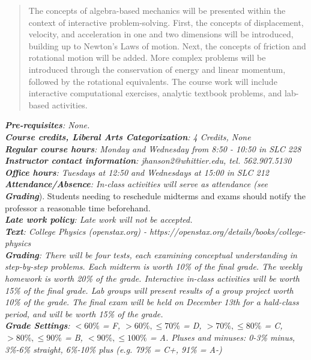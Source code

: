 \documentclass[10pt]{article}
\begin{document}
\maketitle

\begin{abstract}
The concepts of algebra-based mechanics will be presented within the context of interactive problem-solving.  First, the concepts of displacement, velocity, and acceleration in one and two dimensions will be introduced, building up to Newton's Laws of motion.  Next, the concepts of friction and rotational motion will be added.  More complex problems will be introduced through the conservation of energy and linear momentum, followed by the rotational equivalents.  The course work will include interactive computational exercises, analytic textbook problems, and lab-based activities.
\end{abstract}
\noindent
\textit{\textbf{Pre-requisites}: None.} \\
\textit{\textbf{Course credits, Liberal Arts Categorization}: 4 Credits, None} \\
\textit{\textbf{Regular course hours}: Monday and Wednesday from 8:50 - 10:50 in SLC 228} \\
\textit{\textbf{Instructor contact information}: jhanson2@whittier.edu, tel. 562.907.5130} \\
\textit{\textbf{Office hours}: Tuesdays at 12:50 and Wednesdays at 15:00 in SLC 212} \\
\textit{\textbf{Attendance/Absence}: In-class activities will serve as attendance (see \textit{\textbf{Grading}}}).  Students needing to reschedule midterms and exams should notify the professor a reasonable time beforehand. \\
\textit{\textbf{Late work policy}: Late work will not be accepted.} \\
\textit{\textbf{Text}: College Physics (openstax.org) -  https://openstax.org/details/books/college-physics} \\
\textit{\textbf{Grading}: There will be four tests, each examining conceptual understanding in step-by-step problems.  Each midterm is worth 10\% of the final grade.  The weekly homework is worth 20\% of the grade.  Interactive in-class activities will be worth 15\% of the final grade.  Lab groups will present results of a group project worth 10\% of the grade.  The final exam will be held on December 13th for a hald-class period, and will be worth 15\% of the grade.} \\
\textit{\textbf{Grade Settings}: $<60\%$ = F, $>60\%,\leq 70\%$ = D, $>70\%,\leq80\%$ = C, $>80\%,\leq 90\%$ = B, $<90\%,\leq 100\%$ = A.  Pluses and minuses: 0-3\% minus, 3\%-6\% straight, 6\%-10\% plus (e.g. 79\% = C+, 91\% = A-)} \\
\end{document}
